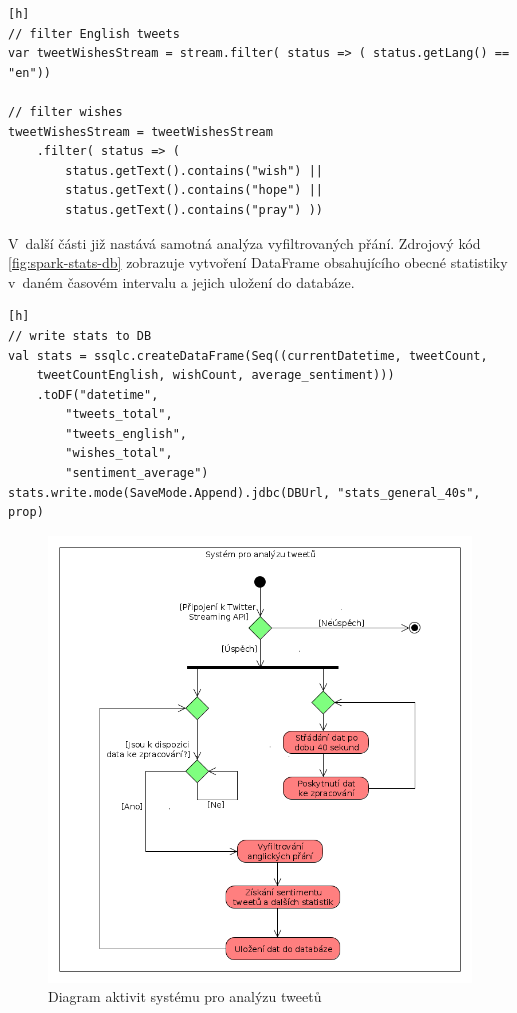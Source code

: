 \documentclass[thesis=B,czech]{FITthesis}[2012/06/26]
\begin{document}
\begin{lstlisting}[caption={Vyfiltrování anglických přání},label=fig:spark-filter][h]
// filter English tweets
var tweetWishesStream = stream.filter( status => ( status.getLang() == "en"))

// filter wishes
tweetWishesStream = tweetWishesStream
	.filter( status => (
		status.getText().contains("wish") ||
		status.getText().contains("hope") ||
		status.getText().contains("pray") ))
\end{lstlisting}


V~další části již nastává samotná analýza vyfiltrovaných přání. Zdrojový kód \ref{fig:spark-stats-db} zobrazuje vytvoření DataFrame obsahujícího obecné statistiky v~daném časovém intervalu a jejich uložení do databáze. 

\begin{lstlisting}[caption={Ukládání statistik do databáze},label=fig:spark-stats-db][h]
// write stats to DB
val stats = ssqlc.createDataFrame(Seq((currentDatetime, tweetCount,
	tweetCountEnglish, wishCount, average_sentiment)))
	.toDF("datetime",
		"tweets_total",
		"tweets_english",
		"wishes_total",
		"sentiment_average")
stats.write.mode(SaveMode.Append).jdbc(DBUrl, "stats_general_40s", prop)
\end{lstlisting}

	
\begin{figure}[h]
   	\centering
   	\includegraphics[width=1\textwidth]{images/activity-diagram.png}
   	\caption{Diagram aktivit systému pro analýzu tweetů}
   	\label{fig:activity_diagram}
\end{figure}
\end{document}
